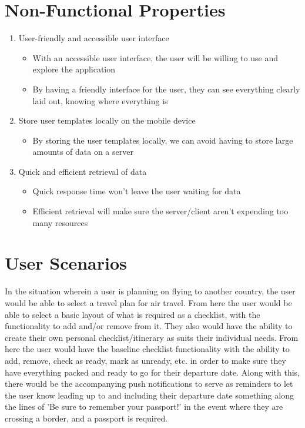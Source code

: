 \documentclass[12pt]{article}
\begin{document}
\section*{Non-Functional Properties}


	\begin{enumerate}

		\item{User-friendly and accessible user interface}
			\begin{itemize}
				\item{With an accessible user interface, the user will be willing to use and explore the application}
				\item{By having a friendly interface for the user, they can see everything clearly laid out, knowing where everything is}
			\end{itemize}

		\item{Store user templates locally on the mobile device}
			\begin{itemize}
				\item{By storing the user templates locally, we can avoid having to store large amounts of data on a server}
			\end{itemize}

		\item{Quick and efficient retrieval of data}
			\begin{itemize}
				\item{Quick response time won't leave the user waiting for data}
				\item{Efficient retrieval will make sure the server/client aren't expending too many resources}
			\end{itemize}
	\end{enumerate}

\pagebreak

\section*{User Scenarios}

	In the situation wherein a user is planning on flying to another country, the user would be able to select a travel plan for air travel.
	From here the user would be able to select a basic layout of what is required as a checklist, with the functionality to add and/or remove from it.
	They also would have the ability to create their own personal checklist/itinerary as suits their individual needs.
	From here the user would have the baseline checklist functionality with the ability to add, remove, check as ready, mark as unready, etc. in order to make sure they have everything packed and ready to go for their departure date.
	Along with this, there would be the accompanying push notifications to serve as reminders to let the user know leading up to and including their departure date something along the lines of 'Be sure to remember your passport!' in the event where they are crossing a border, and a passport is required.
\end{document}
